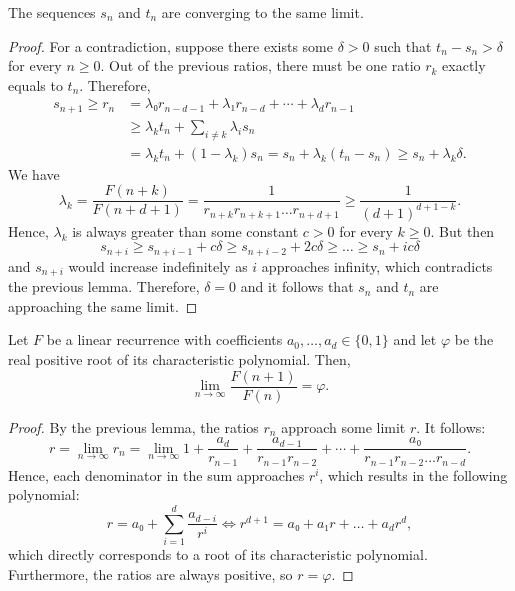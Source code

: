 \begin{lemma}
  The sequences $s_n$ and $t_n$ are converging to the same limit.
\end{lemma}

\begin{proof}
  For a contradiction, suppose there exists some $δ > 0$ such that $t_n - s_n > δ$ for every $n ≥ 0$.
  Out of the previous ratios, there must be one ratio $r_k$ exactly equals to $t_n$.
  Therefore,
  \begin{align*}
    s_{n+1} ≥ r_n & = λ₀ r_{n-d-1} + λ₁ r_{n-d} + ⋯ + λ_d r_{n-1} \\
                  & ≥ λ_k t_n + \sum_{i ≠ k} λ_i s_n \\
                  & = λ_k t_n + (1 - λ_k) s_n = s_n + λ_k (t_n - s_n) ≥ s_n + λ_k δ.
  \end{align*}
  We have
  \[
    λ_k = \frac{F(n+k)}{F(n+d+1)} = \frac{1}{r_{n+k} r_{n+k+1} \dots r_{n+d+1}} ≥ \frac{1}{(d+1)^{d+1-k}}.
  \]
  Hence, $λ_k$ is always greater than some constant $c > 0$ for every $k ≥ 0$.
  But then
  \[
    s_{n+i} ≥ s_{n+i-1} + c δ ≥ s_{n+i-2} + 2c δ ≥ \dots ≥ s_n + i c δ
  \]
  and $s_{n+i}$ would increase indefinitely as $i$ approaches infinity,
  which contradicts the previous lemma.
  Therefore, $δ = 0$ and it follows that $s_n$ and $t_n$ are approaching the same limit.
\end{proof}

\begin{theorem}
  Let $F$ be a linear recurrence with coefficients $a_0, \dots, a_d ∈ \{0,1\}$
  and let $φ$ be the real positive root of its characteristic polynomial.
  Then,
  \[
    \lim_{n \to \infty} \frac{F(n + 1)}{F(n)} = φ.
  \]
\end{theorem}

\begin{proof}
  By the previous lemma, the ratios $r_n$ approach some limit $r$. It follows:
  \[
    r
    = \lim_{n → ∞} r_n
    = \lim_{n → ∞} 1 + \frac{a_d}{r_{n-1}} + \frac{a_{d-1}}{r_{n-1} r_{n-2}} + ⋯ + \frac{a₀}{r_{n-1} r_{n-2} \dots r_{n-d}}.
  \]
  Hence, each denominator in the sum approaches $r^i$,
  which results in the following polynomial:
  \[
    r = a₀ + \sum_{i = 1}^d \frac{a_{d - i}}{r^i}
    \iff
    r^{d+1} = a₀ + a₁ r + \dots + a_d r^d,
  \]
  which directly corresponds to a root of its characteristic polynomial.
  Furthermore, the ratios are always positive, so $r = φ$.
\end{proof}

